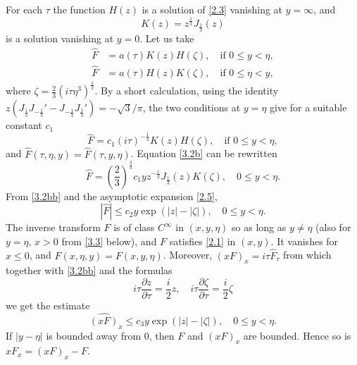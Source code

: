 \documentclass[leqno]{article}
\numberwithin{equation}{section}
\theoremstyle{plain}
\begin{document}
For each $\tau$ the function $H(z)$ is a solution of \eqref{2.3} vanishing at $y = \infty$, and
\begin{equation*}
	K(z) = z^{\frac 13} J_{\frac 13}(z)
\end{equation*}
is a solution vanishing at $y = 0$.
Let us take
\begin{align*}
	\hat{F} & = a(\tau) K(z) H(\zeta), \quad \text{if } 0 \leq y < \eta,\\
	\hat{F} & = a(\tau) H(z) K(\zeta), \quad \text{if } 0 \leq \eta < y,
\end{align*}
where $\zeta = \frac 2 3 (i \tau \eta^3)^{\frac 12}$.
By a short calculation, using the identity $z(J_{\frac13} J_{-\frac13}'-J_{-\frac13}J_{\frac13}') = - \sqrt{3} / \pi$, the two conditions at $y = \eta$ give for a suitable constant $c_1$
\begin{equation}
	\label{3.2b} \tag{3.2'}
	\hat{F} = c_1 (i\tau)^{-\frac13} K(z) H(\zeta), \quad \text{if } 0 \leq y < \eta,
\end{equation}
and $\hat{F}(\tau,\eta,y) = \hat{F}(\tau,y,\eta)$.
Equation \eqref{3.2b} can be rewritten
\begin{equation}
	\label{3.2bb} \tag{3.2''}
	\hat{F} = \left(\frac 2 3\right)^{\frac 2 3} c_1 y z^{-\frac13}J_{\frac13}(z)K(\zeta),
	\quad 0 \leq y < \eta.
\end{equation}
From \eqref{3.2bb} and the asymptotic expansion \eqref{2.5}, 
\begin{equation*}
	|\hat{F}| \leq c_2 y \exp (|z|-|\zeta|), 
	\quad 0 \leq y < \eta.
\end{equation*}
The inverse transform $F$ is of class $C^\infty$ in $(x,y,\eta)$ so as long as $y \neq \eta$ (also for $y = \eta$, $x > 0$ from \eqref{3.3} below), and $F$ satisfies \eqref{2.1} in $(x,y)$.
It vanishes for $x \leq 0$, and $F(x,\eta,y) = F(x,y,\eta)$.
Moreover, $(xF)_x = i\tau \hat{F}_\tau$ from which together with \eqref{3.2bb} and the formulas
\begin{equation*}
	i\tau \frac{\partial z}{\partial \tau} = \frac{i}{2} z, \quad 
	i\tau \frac{\partial \zeta}{\partial \tau} = \frac{i}{2} \zeta
\end{equation*}
we get the estimate
\begin{equation*}
	\widehat{(xF)}_x \leq c_3 y \exp(|z|-|\zeta|),
	\quad 0 \leq y < \eta.
\end{equation*}
If $|y-\eta|$ is bounded away from $0$, then $F$ and $(xF)_x$ are bounded.
Hence so is $x F_x = (xF)_x - F$.
\end{document}
